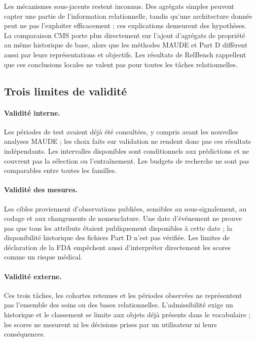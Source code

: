 Les mécanismes sous-jacents restent inconnus. Des agrégats simples peuvent capter une partie de l'information relationnelle, tandis qu'une architecture donnée peut ne pas l'exploiter efficacement ; ces explications demeurent des hypothèses. La comparaison CMS porte plus directement sur l'ajout d'agrégats de propriété au même historique de base, alors que les méthodes MAUDE et Part D diffèrent aussi par leurs représentations et objectifs. Les résultats de RelBench rappellent que ces conclusions locales ne valent pas pour toutes les tâches relationnelles\cite{robinson2024relbench,gu2026relbench}.

\subsection{Trois limites de validité}

\paragraph{Validité interne.} Les périodes de test avaient déjà été consultées, y compris avant les nouvelles analyses MAUDE ; les choix faits sur validation ne rendent donc pas ces résultats indépendants. Les intervalles disponibles sont conditionnels aux prédictions et ne couvrent pas la sélection ou l'entraînement. Les budgets de recherche ne sont pas comparables entre toutes les familles.

\paragraph{Validité des mesures.} Les cibles proviennent d'observations publiées, sensibles au sous-signalement, au codage et aux changements de nomenclature. Une date d'événement ne prouve pas que tous les attributs étaient publiquement disponibles à cette date ; la disponibilité historique des fichiers Part D n'est pas vérifiée\cite{hgbresults}. Les limites de déclaration de la FDA empêchent aussi d'interpréter directement les scores comme un risque médical\cite{fda2026}.

\paragraph{Validité externe.} Ces trois tâches, les cohortes retenues et les périodes observées ne représentent pas l'ensemble des soins ou des bases relationnelles. L'admissibilité exige un historique et le classement se limite aux objets déjà présents dans le vocabulaire ; les scores ne mesurent ni les décisions prises par un utilisateur ni leurs conséquences.

